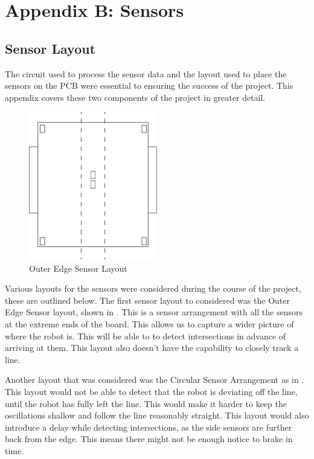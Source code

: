 \documentclass{article}
\begin{document}
\vfill

\clearpage

\section{Appendix B: Sensors}

\subsection{Sensor Layout}

The circuit used to process the sensor data and the layout used to place the sensors on the PCB were essential to ensuring the success of the project. This appendix covers these two components of the project in greater detail.

\begin{figure}[!h]
\centerline{\includegraphics[width=0.5\textwidth]{outer_edge_sensor}}
\caption{Outer Edge Sensor Layout}
\label{fig:outer_edge_sensor}
\end{figure}

Various layouts for the sensors were considered during the course of the project, these are outlined below. The first sensor layout to considered was the Outer Edge Sensor layout, shown in . This is a sensor arrangement with all the sensors at the extreme ends of the board. This allows us to capture a wider picture of where the robot is. This will be able to to detect intersections in advance of arriving at them. This layout also doesn't have the capability to closely track a line.

Another layout that was considered was the Circular Sensor Arrangement as in . This layout would not be able to detect that the robot is deviating off the line, until the robot has fully left the line. This would make it harder to keep the oscillations shallow and follow the line reasonably straight. This layout would also introduce a delay while detecting intersections, as the side sensors are further back from the edge. This means there might not be enough notice to brake in time.
\end{document}
